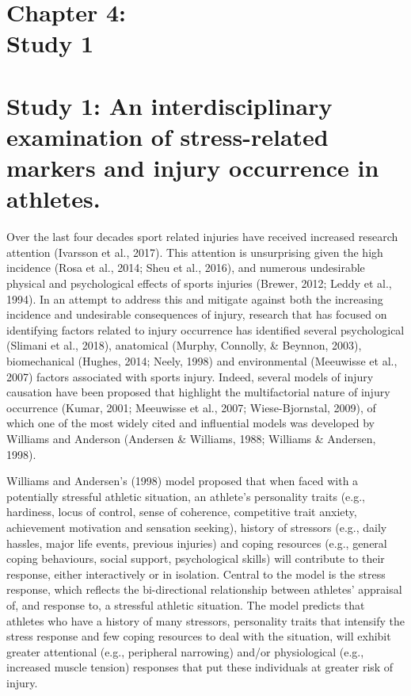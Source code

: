 \documentclass[
  english,
  man,floatsintext]{apa6}
\begin{document}
\vspace*{3cm}

\section[Chapter 4: Study 1]{\Large{Chapter 4: \\ Study 1}}

\clearpage

\hypertarget{study-1-an-interdisciplinary-examination-of-stress-related-markers-and-injury-occurrence-in-athletes.}{%
\section{Study 1: An interdisciplinary examination of stress-related markers and injury occurrence in athletes.}\label{study-1-an-interdisciplinary-examination-of-stress-related-markers-and-injury-occurrence-in-athletes.}}

Over the last four decades sport related injuries have received increased research attention (Ivarsson et al., 2017).
This attention is unsurprising given the high incidence (Rosa et al., 2014; Sheu et al., 2016),
and numerous undesirable physical and psychological effects of sports injuries (Brewer, 2012; Leddy et al., 1994).
In an attempt to address this and mitigate against both the increasing incidence and undesirable consequences of injury, research that has focused on identifying factors related to injury occurrence
has identified several psychological (Slimani et al., 2018),
anatomical (Murphy, Connolly, \& Beynnon, 2003),
biomechanical (Hughes, 2014; Neely, 1998)
and environmental (Meeuwisse et al., 2007)
factors associated with sports injury.
Indeed, several models of injury causation have been proposed that highlight the multifactorial nature of injury occurrence (Kumar, 2001; Meeuwisse et al., 2007; Wiese-Bjornstal, 2009),
of which one of the most widely cited and influential models was developed by Williams and Anderson (Andersen \& Williams, 1988; Williams \& Andersen, 1998).

Williams and Andersen's (1998) model proposed that when faced with a potentially stressful athletic situation, an athlete's personality traits (e.g., hardiness, locus of control, sense of coherence, competitive trait anxiety, achievement motivation and sensation seeking), history of stressors (e.g., daily hassles, major life events, previous injuries) and coping resources (e.g., general coping behaviours, social support, psychological skills) will contribute to their response, either interactively or in isolation.
Central to the model is the stress response, which reflects the bi-directional relationship between athletes' appraisal of, and response to, a stressful athletic situation. The model predicts that athletes who have a history of many stressors, personality traits that intensify the stress response and few coping resources to deal with the situation, will exhibit greater attentional (e.g., peripheral narrowing) and/or physiological (e.g., increased muscle tension) responses that put these individuals at greater risk of injury.
\end{document}
